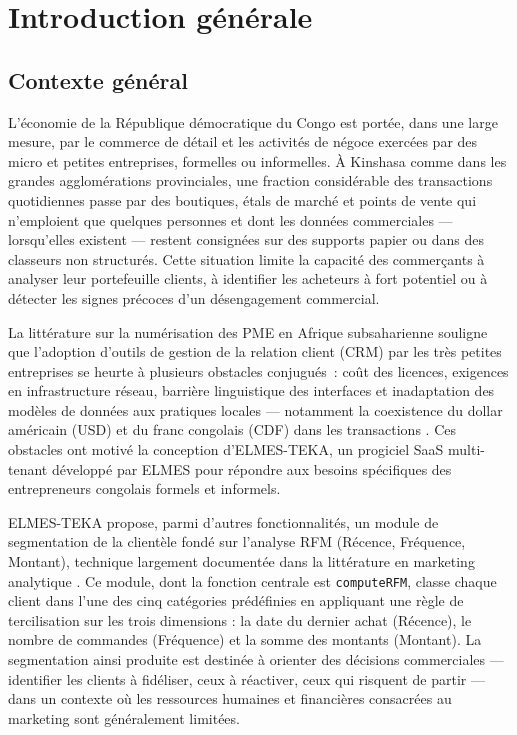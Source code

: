 \chapter*{Introduction générale}
\label{chap:introduction}

\section*{Contexte général}

L'économie de la République démocratique du Congo est portée, dans une large mesure, par le
commerce de détail et les activités de négoce exercées par des micro et petites entreprises,
formelles ou informelles. À Kinshasa comme dans les grandes agglomérations provinciales, une
fraction considérable des transactions quotidiennes passe par des boutiques, étals de marché
et points de vente qui n'emploient que quelques personnes et dont les données commerciales —
lorsqu'elles existent — restent consignées sur des supports papier ou dans des classeurs
non structurés. Cette situation limite la capacité des commerçants à analyser leur portefeuille
clients, à identifier les acheteurs à fort potentiel ou à détecter les signes précoces d'un
désengagement commercial.

La littérature sur la numérisation des PME en Afrique subsaharienne souligne que l'adoption
d'outils de gestion de la relation client (CRM) par les très petites entreprises se heurte à
plusieurs obstacles conjugués~: coût des licences, exigences en infrastructure réseau, barrière
linguistique des interfaces et inadaptation des modèles de données aux pratiques locales —
notamment la coexistence du dollar américain (USD) et du franc congolais (CDF) dans les
transactions \citep{Sobantu2025, Yoseph2023}. Ces obstacles ont motivé la conception
d'ELMES-TEKA, un progiciel SaaS multi-tenant développé par ELMES pour répondre aux besoins
spécifiques des entrepreneurs congolais formels et informels.

ELMES-TEKA propose, parmi d'autres fonctionnalités, un module de segmentation de la clientèle
fondé sur l'analyse RFM (Récence, Fréquence, Montant), technique largement documentée dans la
littérature en marketing analytique \citep{Fader2005, Salminen2023}. Ce module, dont la
fonction centrale est \texttt{computeRFM}, classe chaque client dans l'une des cinq catégories
prédéfinies en appliquant une règle de tercilisation sur les trois dimensions : la date du
dernier achat (Récence), le nombre de commandes (Fréquence) et la somme des montants
(Montant). La segmentation ainsi produite est destinée à orienter des décisions commerciales —
identifier les clients à fidéliser, ceux à réactiver, ceux qui risquent de partir — dans un
contexte où les ressources humaines et financières consacrées au marketing sont généralement
limitées.

